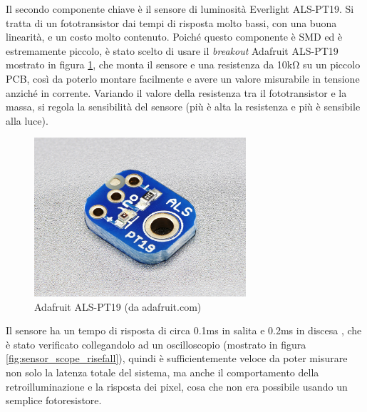 Il secondo componente chiave è il sensore di luminosità Everlight ALS-PT19. Si tratta di un fototransistor dai tempi di risposta molto bassi, con una buona linearità, e un costo molto contenuto. Poiché questo componente è SMD ed è estremamente piccolo, è stato scelto di usare il \textit{breakout} Adafruit ALS-PT19 mostrato in figura \ref{fig:adafruit_pt19}, che monta il sensore e una resistenza da 10k\si{\ohm} su un piccolo PCB, così da poterlo montare facilmente e avere un valore misurabile in tensione anziché in corrente. Variando il valore della resistenza tra il fototransistor e la massa, si regola la sensibilità del sensore (più è alta la resistenza e più è sensibile alla luce).
\begin{figure}[h]
	\centering
	\includegraphics[width=0.7\textwidth]{Dispositivo_files/als-pt19.jpg}
	\caption{Adafruit ALS-PT19 (da adafruit.com)}
	\label{fig:adafruit_pt19}
\end{figure}

Il sensore ha un tempo di risposta di circa 0.1ms in salita e 0.2ms in discesa \cite{als_pt19_datasheet}, che è stato verificato collegandolo ad un oscilloscopio (mostrato in figura \ref{fig:sensor_scope_risefall}), quindi è sufficientemente veloce da poter misurare non solo la latenza totale del sistema, ma anche il comportamento della retroilluminazione e la risposta dei pixel, cosa che non era possibile usando un semplice fotoresistore.

